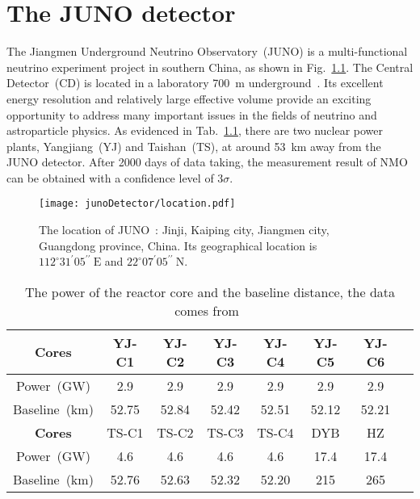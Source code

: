 \chapter{The JUNO detector}
The Jiangmen Underground Neutrino Observatory~(JUNO) is a multi-functional neutrino experiment project in southern China, as shown in Fig.~\ref{fig:juno_site}. The Central Detector~(CD) is located in a laboratory \SI{700}{m} underground~\cite{muon207}. Its excellent energy resolution and relatively large effective volume provide an exciting opportunity to address many important issues in the fields of neutrino and astroparticle physics. As evidenced in Tab.~\ref{tab:juno_core}, there are two nuclear power plants, Yangjiang~(YJ) and Taishan~(TS), at around \SI{53}{km} away from the JUNO detector. After 2000 days of data taking, the measurement result of NMO can be obtained with a confidence level of $3\sigma$.

\begin{figure}[htbp]
	\centering
	\texttt{[image: junoDetector/location.pdf]}
	\caption{The location of JUNO~\cite{muon207}: Jinji, Kaiping city, Jiangmen city, Guangdong province, China. Its geographical location is $112^{\circ}31^{\prime}05^{\prime\prime}~\mathrm{E}$ and $22^{\circ}07^{\prime}05^{\prime\prime}~\mathrm{N}$.}
	\label{fig:juno_site}
\end{figure}

\begin{table}[htbp]
	\centering %
	\caption{The power of the reactor core and the baseline distance, the data comes from~\cite{juno_yellow_book}}
	\label{tab:juno_core}
	\begin{tabular}{cccccccc}
		\toprule %
		\textbf{Cores}     & YJ-C1 & YJ-C2 & YJ-C3 & YJ-C4 & YJ-C5 & YJ-C6 \\
		\midrule
		Power~(\si{GW})    & 2.9   & 2.9   & 2.9   & 2.9   & 2.9   & 2.9   \\
		Baseline~(\si{km}) & 52.75 & 52.84 & 52.42 & 52.51 & 52.12 & 52.21 \\
		\addlinespace
		\textbf{Cores}     & TS-C1 & TS-C2 & TS-C3 & TS-C4 & DYB   & HZ    \\
		\midrule
		Power~(\si{GW})    & 4.6   & 4.6   & 4.6   & 4.6   & 17.4  & 17.4  \\
		Baseline~(\si{km}) & 52.76 & 52.63 & 52.32 & 52.20 & 215   & 265   \\
		\bottomrule
	\end{tabular}
\end{table}

